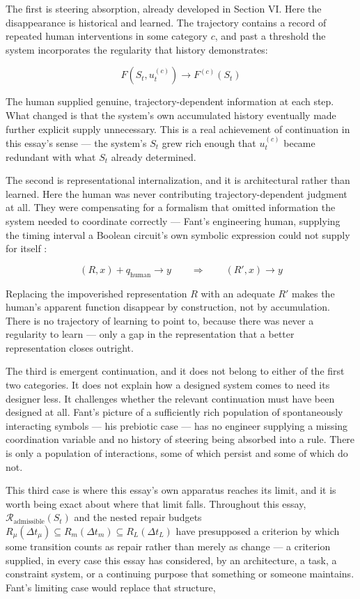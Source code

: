 \documentclass[11pt]{article}
\newcommand{\adm}{\mathrm{admissible}}
\begin{document}
The first is steering absorption, already developed in Section VI. Here the disappearance is historical and learned. The trajectory contains a record of repeated human interventions in some category $c$, and past a threshold the system incorporates the regularity that history demonstrates:

\[
F(S_t, u_t^{(c)}) \longrightarrow F^{(c)}(S_t)
\]

The human supplied genuine, trajectory-dependent information at each step. What changed is that the system's own accumulated history eventually made further explicit supply unnecessary. This is a real achievement of continuation in this essay's sense --- the system's $S_t$ grew rich enough that $u_t^{(c)}$ became redundant with what $S_t$ already determined.

The second is representational internalization, and it is architectural rather than learned. Here the human was never contributing trajectory-dependent judgment at all. They were compensating for a formalism that omitted information the system needed to coordinate correctly --- Fant's engineering human, supplying the timing interval a Boolean circuit's own symbolic expression could not supply for itself \cite{fant2007}:

\[
(R, x) + q_{\mathrm{human}} \to y \qquad \Longrightarrow \qquad (R', x) \to y
\]

Replacing the impoverished representation $R$ with an adequate $R'$ makes the human's apparent function disappear by construction, not by accumulation. There is no trajectory of learning to point to, because there was never a regularity to learn --- only a gap in the representation that a better representation closes outright.

The third is emergent continuation, and it does not belong to either of the first two categories. It does not explain how a designed system comes to need its designer less. It challenges whether the relevant continuation must have been designed at all. Fant's picture of a sufficiently rich population of spontaneously interacting symbols --- his prebiotic case --- has no engineer supplying a missing coordination variable and no history of steering being absorbed into a rule. There is only a population of interactions, some of which persist and some of which do not.

This third case is where this essay's own apparatus reaches its limit, and it is worth being exact about where that limit falls. Throughout this essay, $\mathcal{R}_\adm(S_t)$ and the nested repair budgets $R_\mu(\Delta t_\mu) \subseteq R_m(\Delta t_m) \subseteq R_L(\Delta t_L)$ have presupposed a criterion by which some transition counts as repair rather than merely as change --- a criterion supplied, in every case this essay has considered, by an architecture, a task, a constraint system, or a continuing purpose that something or someone maintains. Fant's limiting case would replace that structure,
\end{document}
